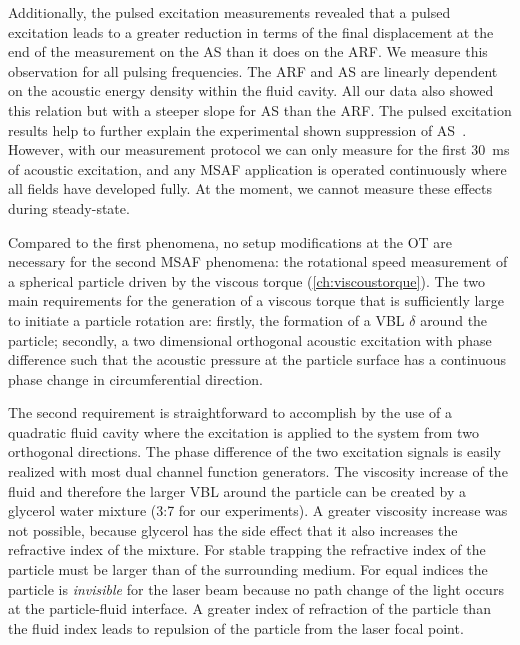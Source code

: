 Additionally, the pulsed excitation measurements revealed that a pulsed 
excitation leads to a greater reduction in terms of the final displacement at 
the end of the measurement on the AS than it does on the ARF. We measure this 
observation for all pulsing frequencies. The ARF and AS are linearly dependent 
on the acoustic energy density within the fluid cavity. All our data also 
showed this relation but with a steeper slope for AS than the ARF. The pulsed 
excitation results help to further explain the experimental shown suppression 
of AS~\cite{Hoyos2013,Castro2016}. However, with our measurement protocol we 
can only measure for the first \SI{30}{\ms} of acoustic excitation, and any 
MSAF application is operated continuously where all fields have developed 
fully. At the moment, we cannot measure these effects during steady-state.


Compared to the first phenomena, no setup modifications at the OT are necessary 
for the second MSAF phenomena: the rotational speed measurement of a spherical 
particle driven by the viscous torque (\cref{ch:viscoustorque}). The two main 
requirements for the generation of a viscous torque that is sufficiently large 
to initiate a particle rotation are: firstly, the formation of a VBL $\delta$ 
around the particle; secondly, a two dimensional orthogonal acoustic excitation 
with phase difference such that the acoustic pressure at the particle surface 
has a continuous phase change in circumferential direction.

The second requirement is straightforward to accomplish by the use of a 
quadratic fluid cavity where the excitation is applied to the system from two 
orthogonal directions. The phase difference of the two excitation signals is 
easily realized with most dual channel function generators. The viscosity 
increase of the fluid and therefore the larger VBL around 
the particle can be created by a glycerol water mixture (3:7 for our 
experiments). A greater viscosity increase was not possible, because glycerol 
has the side effect that it also increases the refractive index of the mixture. 
For stable trapping the refractive index of the particle must be larger than of 
the surrounding medium. For equal indices the particle is \emph{invisible} for 
the laser beam because no path change of the light occurs at the particle-fluid 
interface. A greater index of refraction of the particle than the fluid index 
leads to repulsion of the particle from the laser focal point.

